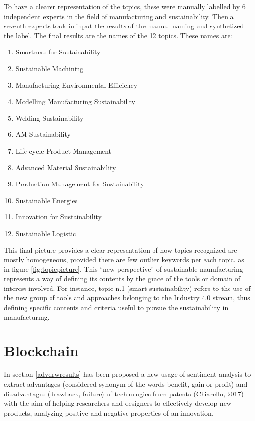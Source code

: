 \documentclass[]{book}
\providecommand{\tightlist}{%
  \setlength{\itemsep}{0pt}\setlength{\parskip}{0pt}}
\begin{document}
To have a clearer representation of the topics, these were manually
labelled by 6 independent experts in the field of manufacturing and
sustainability. Then a seventh experts took in input the results of the
manual naming and synthetized the label. The final results are the names
of the 12 topics. These names are:

\begin{enumerate}
\def\labelenumi{\arabic{enumi}.}
\tightlist
\item
  Smartness for Sustainability
\item
  Sustainable Machining
\item
  Manufacturing Environmental Efficiency
\item
  Modelling Manufacturing Sustainability
\item
  Welding Sustainability
\item
  AM Sustainability
\item
  Life-cycle Product Management
\item
  Advanced Material Sustainability
\item
  Production Management for Sustainability
\item
  Sustainable Energies
\item
  Innovation for Sustainability
\item
  Sustainable Logistic
\end{enumerate}

This final picture provides a clear representation of how topics
recognized are mostly homogeneous, provided there are few outlier
keywords per each topic, as in figure \ref{fig:topicpicture}. This ``new
perspective'' of sustainable manufacturing represents a way of defining
its contents by the grace of the tools or domain of interest involved.
For instance, topic n.1 (smart sustainability) refers to the use of the
new group of tools and approaches belonging to the Industry 4.0 stream,
thus defining specific contents and criteria useful to pursue the
sustainability in manufacturing.

\section{Blockchain}\label{blockchain}

In section \ref{advdrwresults} has been proposed a new usage of
sentiment analysis to extract advantages (considered synonym of the
words benefit, gain or profit) and disadvantages (drawback, failure) of
technologies from patents (Chiarello, 2017) with the aim of helping
researchers and designers to effectively develop new products, analyzing
positive and negative properties of an innovation.
\end{document}
